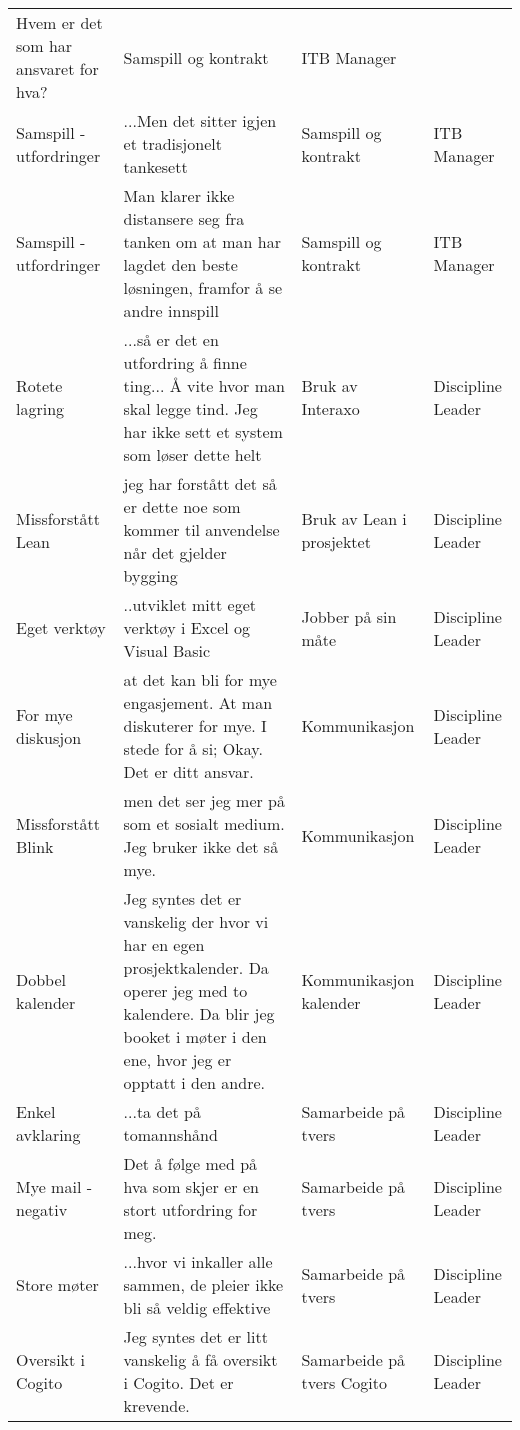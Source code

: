 \begin{landscape}
\begin{longtable}{p{0.25\textheight}p{0.5\textheight}p{0.25\textheight}p{0.25\textheight}}
      Hvem er det som har ansvaret for hva? &
      Samspill og kontrakt &
      ITB Manager \\
    Samspill - utfordringer &
      ...Men det sitter igjen et tradisjonelt tankesett &
      Samspill og kontrakt &
      ITB Manager \\
    Samspill - utfordringer &
      Man klarer ikke distansere seg fra tanken om at man har lagdet den beste løsningen, framfor å se andre innspill &
      Samspill og kontrakt &
      ITB Manager \\
    Rotete lagring &
      ...så er det en utfordring å finne ting... Å vite hvor man skal legge tind. Jeg har ikke sett et system som løser dette helt &
      Bruk av Interaxo &
      Discipline Leader \\
    Missforstått Lean &
      jeg har forstått det så er dette noe som kommer til anvendelse når det gjelder bygging &
      Bruk av Lean i prosjektet &
      Discipline Leader \\
    Eget verktøy &
      ..utviklet mitt eget verktøy i Excel og Visual Basic &
      Jobber på sin måte &
      Discipline Leader \\
    For mye diskusjon &
      at det kan bli for mye engasjement. At man diskuterer for mye. I stede for å si; Okay. Det er ditt ansvar. &
      Kommunikasjon &
      Discipline Leader \\
    Missforstått Blink &
      men det ser jeg mer på som et sosialt medium. Jeg bruker ikke det så mye. &
      Kommunikasjon &
      Discipline Leader \\
    Dobbel kalender &
      Jeg syntes det er vanskelig der hvor vi har en egen prosjektkalender. Da operer jeg med to kalendere. Da blir jeg booket i møter i den ene, hvor jeg er opptatt i den andre. &
      Kommunikasjon kalender &
      Discipline Leader \\
    Enkel avklaring &
      ...ta det på tomannshånd &
      Samarbeide på tvers &
      Discipline Leader \\
    Mye mail - negativ &
      Det å følge med på hva som skjer er en stort utfordring for meg. &
      Samarbeide på tvers &
      Discipline Leader \\
    Store møter &
      ...hvor vi inkaller alle sammen, de pleier ikke bli så veldig effektive &
      Samarbeide på tvers &
      Discipline Leader \\
    Oversikt i Cogito &
      Jeg syntes det er litt vanskelig å få oversikt i Cogito. Det er krevende. &
      Samarbeide på tvers Cogito &
      Discipline Leader \\

\end{longtable}
\end{landscape}
